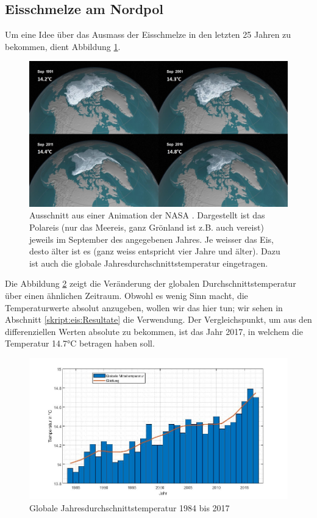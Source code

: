\begin{refsection}
\subsection{Eisschmelze am Nordpol}
Um eine Idee über das Ausmass der Eisschmelze in den letzten 25 Jahren zu bekommen, dient Abbildung \ref{skript:eis:fig:NASAohne}.
\begin{figure}
	\centering
	\includegraphics[width=14cm]{eis/NASA_ohne_Breitengraden.jpg}
	\caption{Ausschnitt aus einer Animation der NASA \cite{skript:eis:animation_NASA}. Dargestellt ist das Polareis (nur das Meereis, ganz Grönland ist z.B. auch vereist) jeweils im September des angegebenen Jahres. Je weisser das Eis, desto älter ist es (ganz weiss entspricht vier Jahre und älter).	Dazu ist auch die globale Jahresdurchschnittstemperatur eingetragen.}
	\label{skript:eis:fig:NASAohne}
\end{figure}
Die Abbildung \ref{skript:eis:fig:globale_Mitteltemperaturen} zeigt die Veränderung der globalen Durchschnittstemperatur über einen ähnlichen Zeitraum. Obwohl es wenig Sinn macht, die Temperaturwerte absolut anzugeben, wollen wir das hier tun; wir sehen in Abschnitt \ref{skript:eis:Resultate} die Verwendung. Der Vergleichspunkt, um aus den differenziellen Werten \cite{skript:eis:vitalsign_NASA} absolute zu bekommen, ist das Jahr 2017, in welchem die Temperatur 14.7°C \cite{skript:eis:ref2017} betragen haben soll.
\begin{figure}
	\centering
	\includegraphics[width=14cm]{eis/globale_Mitteltemperaturen.jpg}
	\caption{Globale Jahresdurchschnittstemperatur 1984 bis 2017}
	\label{skript:eis:fig:globale_Mitteltemperaturen}
\end{figure}

\end{refsection}
